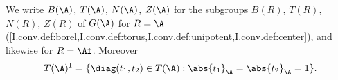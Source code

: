 We write $B(\A)$, $T(\A)$, $N(\A)$, $Z(\A)$ for the subgroups $B(R)$, $T(R)$, $N(R)$, $Z(R)$ of $G(\A)$ for $R=\A$
(\cref{I.conv.def:borel,I.conv.def:torus,I.conv.def:unipotent,I.conv.def:center}), and likewise for $R=\Af$. Moreover
\[
  T(\A)^1=\{\diag(t_1,t_2)\in T(\A):\abs{t_1}_\A=\abs{t_2}_\A=1\}.
\]
